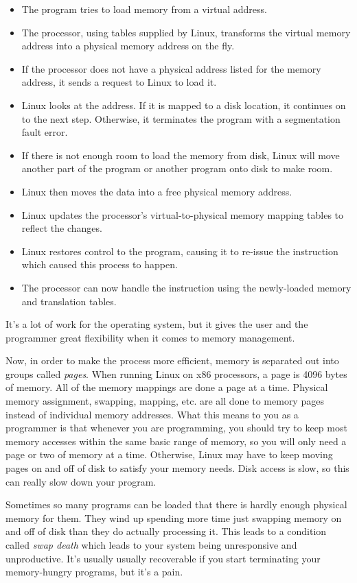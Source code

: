 \begin{itemize}\item The program tries to load memory from a virtual address. 
\item The processor, using tables supplied by Linux, transforms the virtual memory address into a physical memory address on the fly. 
\item If the processor does not have a physical address listed for the memory address, it sends a request to Linux to load it. 
\item Linux looks at the address.  If it is mapped to a disk location, it continues on to the next step.  Otherwise, it terminates the program with a segmentation fault error. 
\item If there is not enough room to load the memory from disk, Linux will move another part of the program or another program onto disk to make room. 
\item Linux then moves the data into a free physical memory address. 
\item Linux updates the processor's virtual-to-physical memory mapping tables to reflect the changes. 
\item Linux restores control to the program, causing it to re-issue the instruction which caused this process to happen. 
\item The processor can now handle the instruction using the newly-loaded memory and translation tables. 
\end{itemize}

It's a lot of work for the operating system, but it gives the user and the programmer great
flexibility when it comes to memory management.

Now, in order to make the process more efficient,
memory is separated out into groups called \emph{pages}.  When
running Linux on x86 processors, a page is 4096 bytes of memory.
All of the memory mappings are done a page at a time.  Physical memory assignment,
swapping, mapping, etc. are all done to memory pages instead of individual memory
addresses.  What this means to you as a programmer
is that whenever you are programming, you should try to keep most memory accesses within
the same basic range of memory, so you will only need a page or two of memory at
a time.  Otherwise, Linux may have to keep moving pages on and off of disk to 
satisfy your memory needs. Disk access is slow, so this can really slow down your program. 

Sometimes so many programs can be loaded that there is hardly enough physical
memory for them.  They wind up spending more time just swapping memory on and off of disk
than they do actually processing it.  This leads to a condition called 
\emph{swap death}
which leads to your system being unresponsive and unproductive.  It's usually
usually recoverable if you start terminating your memory-hungry programs, but it's a pain.

